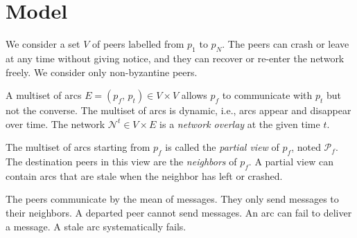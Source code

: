 
\section{Model}

We consider a set $V$ of peers labelled from $p_1$ to $p_N$.  The peers can
crash or leave at any time without giving notice, and they can recover or
re-enter the network freely. We consider only non-byzantine peers.

A multiset of arcs $E = (p_f,\,p_t) \in V \times V$ allows $p_f$ to communicate
with $p_t$ but not the converse. The multiset of arcs is dynamic, i.e., arcs
appear and disappear over time. The network $\mathcal{N}^t \in V \times E$ is a
\emph{network overlay} at the given time $t$.

The multiset of arcs starting from $p_f$ is called the \emph{partial view} of
$p_f$, noted $\mathcal{P}_f$. The destination peers in this view are the
\emph{neighbors} of $p_f$. A partial view can contain arcs that are stale when
the neighbor has left or crashed.

The peers communicate by the mean of messages. They only send messages to their
neighbors. A departed peer cannot send messages. An arc can fail to deliver a
message. A stale arc systematically fails.


